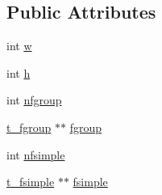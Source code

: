 \subsection*{\-Public \-Attributes}
\begin{DoxyCompactItemize}
\item 
int \hyperlink{structt__fgrid_a00f9201832611c840e4edf8b1c2315fa}{w}
\item 
int \hyperlink{structt__fgrid_a196df2c8d7817eda38fa5a3f454f6131}{h}
\item 
int \hyperlink{structt__fgrid_ab766b0d0dba32b1cabc4bb737f1487f7}{nfgroup}
\item 
\hyperlink{structt__fgroup}{t\-\_\-fgroup} $\ast$$\ast$ \hyperlink{structt__fgrid_a16e3153be2eff0a6f6e66c7cbfd2c59b}{fgroup}
\item 
int \hyperlink{structt__fgrid_a1797c5072c8d7a91f2c96dcbe23eb854}{nfsimple}
\item 
\hyperlink{structt__fsimple}{t\-\_\-fsimple} $\ast$$\ast$ \hyperlink{structt__fgrid_a9b69f5d9cdac65e29a8d10e03c26a571}{fsimple}
\end{DoxyCompactItemize}


